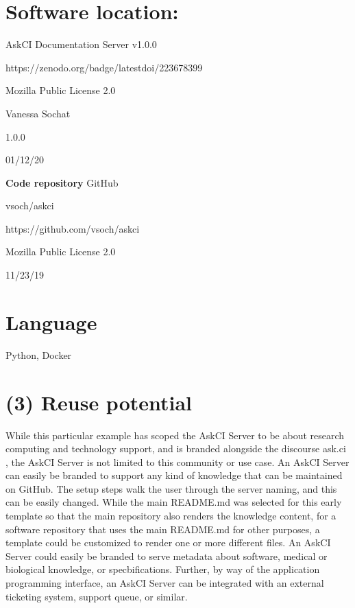 \documentclass{jors}
\begin{document}
\section*{Software location:}

\begin{description}[noitemsep,topsep=0pt]
	\item[Name:] AskCI Documentation Server v1.0.0
	\item[Persistent identifier:] https://zenodo.org/badge/latestdoi/223678399
	\item[License:] Mozilla Public License 2.0
	\item[Publisher:]  Vanessa Sochat
	\item[Version published:] 1.0.0
	\item[Date published:] 01/12/20
\end{description}

{\bf Code repository} GitHub

\begin{description}[noitemsep,topsep=0pt]
	\item[Name:] vsoch/askci
	\item[Persistent identifier:] https://github.com/vsoch/askci
	\item[License:] Mozilla Public License 2.0
	\item[Date published:] 11/23/19
\end{description}

\thispagestyle{empty} 
\section*{Language}
Python, Docker

\section*{(3) Reuse potential}

While this particular example has scoped the AskCI Server to be about research computing and technology support, and is
branded alongside the discourse ask.ci \cite{askci}, the AskCI Server is not limited to this community or use case. 
An AskCI Server can easily be branded to support any kind of knowledge that can be maintained on GitHub. The setup steps walk the user through the server naming, and this can be easily changed. While the main
README.md was selected for this early template so that the main repository also renders the knowledge content, for a software repository
that uses the main README.md for other purposes, a template could be customized to render one or more different files.
An AskCI Server could easily be branded to serve metadata about software, medical or biological knowledge, or specbifications.
Further, by way of the application programming interface, an AskCI Server can be integrated with an external
ticketing system, support queue, or similar. \newline
\end{document}

